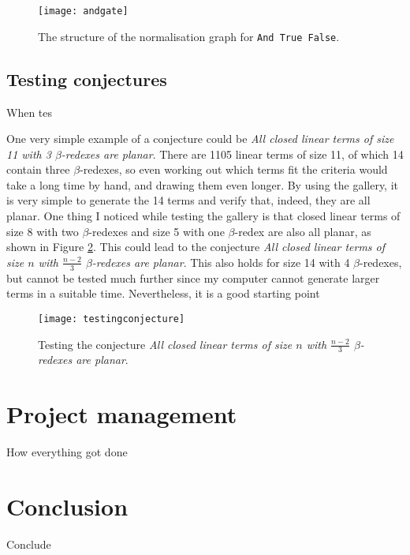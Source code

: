 \documentclass[11pt]{article}
\begin{document}
\begin{figure}
    \centering
    \texttt{[image: andgate]}
    \caption{The structure of the normalisation graph for \texttt{And True False}.}
    \label{fig:andnorm}
\end{figure}

\subsection{Testing conjectures}
When tes

One very simple example of a conjecture could be \textit{All closed linear terms of size 11 with 3 $\beta$-redexes are planar}. There are 1105 linear terms of size 11, of which 14 contain three $\beta$-redexes, so even working out which terms fit the criteria would take a long time by hand, and drawing them even longer. By using the gallery, it is very simple to generate the 14 terms and verify that, indeed, they are all planar. One thing I noticed while testing the gallery is that closed linear terms of size 8 with two $\beta$-redexes and size 5 with one $\beta$-redex are also all planar, as shown in Figure \ref{fig:testingconjecture}. This could lead to the conjecture \textit{All closed linear terms of size $n$ with $\frac{n-2}{3}$ $\beta$-redexes are planar}. This also holds for size 14 with 4 $\beta$-redexes, but cannot be tested much further since my computer cannot generate larger terms in a suitable time. Nevertheless, it is a good starting point

\begin{figure}
    \centering
    \texttt{[image: testingconjecture]}
    \caption{Testing the conjecture \textit{All closed linear terms of size $n$ with $\frac{n-2}{3}$ $\beta$-redexes are planar}.}
    \label{fig:testingconjecture}
\end{figure}


\newpage

\section{Project management}
\label{sec:project-management}
How everything got done

\newpage
\section{Conclusion}
\label{sec:conclusion}
Conclude

\newpage


\end{document}
